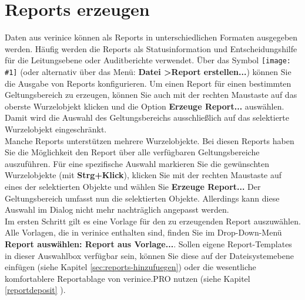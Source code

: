 \documentclass[a4paper,10pt]{book}
\newcommand{\icon}[1]{\texttt{[image: \#1]}}
\begin{document}
\section{Reports erzeugen} \label{Reports erzeugen}
Daten aus verinice können als Reports in unterschiedlichen Formaten ausgegeben werden. Häufig werden die Reports als
Statusinformation und Entscheidungshilfe für die Leitungsebene oder Auditberichte verwendet. Über das Symbol \icon{Icon/Report.png}
(oder alternativ über das Menü: \textbf{Datei \textgreater  Report erstellen...}) können Sie die Ausgabe von Reports konfigurieren. Um einen Report
für einen bestimmten Geltungsbereich zu erzeugen, können Sie auch mit der rechten Maustaste auf das oberste Wurzelobjekt
klicken und die Option \textbf{Erzeuge Report...} auswählen. Damit wird die Auswahl des Geltungsbereichs ausschließlich auf das selektierte Wurzelobjekt
eingeschränkt.\\ Manche Reports unterstützen mehrere Wurzelobjekte. Bei diesen
Reports haben Sie die Möglichkeit den Report über alle verfügbaren
Geltungsbereiche auszuführen. Für eine spezifische Auswahl markieren Sie die
gewünschten Wurzelobjekte (mit \textbf{Strg+Klick}), klicken Sie mit der rechten
Maustaste auf eines der selektierten Objekte und wählen Sie \textbf{Erzeuge
Report...} Der Geltungsbereich umfasst nun die selektierten Objekte.
Allerdings kann diese Auswahl im Dialog nicht mehr nachträglich angepasst
werden.\\

Im ersten Schritt gilt es eine Vorlage für den zu erzeugenden Report
auszuwählen. Alle Vorlagen, die in verinice enthalten sind, finden Sie
im Drop-Down-Menü \textbf{Report auswählen: Report aus Vorlage...}.
Sollen eigene Report-Templates in dieser Auswahlbox verfügbar sein,
können Sie diese auf der Dateisystemebene einfügen (siehe Kapitel \ref{sec:reports-hinzufuegen})
oder die wesentliche komfortablere Reportablage von verinice.PRO nutzen (siehe Kapitel \ref{reportdeposit} ).
\end{document}
